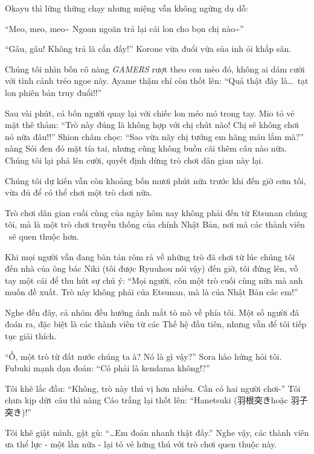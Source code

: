 \documentclass[../main.tex]{subfiles}
\begin{document}
Okayu thì lững thững chạy nhưng miệng vẫn không ngừng dụ dỗ:

``Meo, meo, meo\~{} Ngoan ngoãn trả lại cái lon cho bọn chị nào\~{}''

``Gâu, gâu! Không trả là cắn đấy!'' Korone vừa đuổi vừa sủa inh ỏi khắp sân.

Chúng tôi nhìn bốn cô nàng \textit{GAMERS} rượt theo con mèo đó, không ai dám cười với tình cảnh tréo ngoe này. Ayame thậm chí còn thốt lên: ``Quả thật đây là\dots\ tạt lon phiên bản truy đuổi!!''

\ct

Sau vài phút, cả bốn người quay lại với chiếc lon méo mó trong tay. Mio tỏ vẻ mặt thê thảm: ``Trò này đúng là không hợp với chị chút nào! Chị sẽ không chơi nó nữa đâu!!'' Shion châm chọc: ``Sao vừa nãy chị tưởng em hăng máu lắm mà?'' nàng Sói đen đỏ mặt tía tai, nhưng cũng không buồn cãi thêm câu nào nữa. Chúng tôi lại phá lên cười, quyết định dừng trò chơi dân gian này lại.

\il

Chúng tôi dự kiến vẫn còn khoảng bốn mươi phút nữa trước khi đến giờ cơm tối, vừa đủ để có thể chơi một trò chơi nữa.

Trò chơi dân gian cuối cùng của ngày hôm nay không phải đến từ Etsunan chúng tôi, mà là một trò chơi truyền thống của chính Nhật Bản, nơi mà các thành viên \hll\ sẽ quen thuộc hơn.

Khi mọi người vẫn đang bàn tán rôm rả về những trò đã chơi từ lúc chúng tôi đến nhà của ông bác Niki (tôi được Ryuuhou nói vậy) đến giờ, tôi đứng lên, vỗ tay một cái để thu hút sự chú ý: ``Mọi người, còn một trò cuối cùng nữa mà anh muốn đề xuất. Trò này không phải của Etsunan, mà là của Nhật Bản các em!''

Nghe đến đây, cả nhóm đều hướng ánh mắt tò mò về phía tôi. Một số người đã đoán ra, đặc biệt là các thành viên từ các Thế hệ đầu tiên, nhưng vẫn để tôi tiếp tục giải thích.

``Ồ, một trò từ đất nước chúng ta à? Nó là gì vậy?'' Sora hào hứng hỏi tôi. Fubuki mạnh dạn đoán: ``Có phải là kendama không!?''

Tôi khẽ lắc đầu: ``Không, trò này thú vị hơn nhiều. Cần có hai người chơi-'' Tôi chưa kịp dứt câu thì nàng Cáo trắng lại thốt lên: ``Hanetsuki (羽根突きhoặc 羽子突き)!''

Tôi khẽ giật mình, gật gù: ``\dots Em đoán nhanh thật đấy.'' Nghe vậy, các thành viên ưa thể lực - một lần nữa - lại tỏ vẻ hứng thú với trò chơi quen thuộc này.
\end{document}
